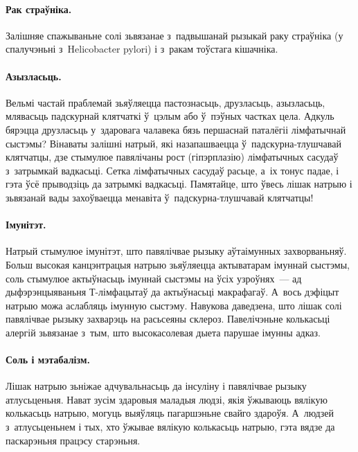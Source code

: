 \paragraph{Рак страўніка.}
Залішняе спажываньне солі зьвязанае з~падвышанай рызыкай раку страўніка (у спалучэньні з~Helicobacter pylori) і з~ракам тоўстага кішачніка.

\paragraph{Азызласьць.}
Вельмі частай праблемай зьяўляецца пастознасьць, друзласьць, азызласьць, млявасьць падскурнай клятчаткі ў~цэлым або ў~пэўных частках цела. Адкуль бярэцца друзласьць у~здаровага чалавека бязь першаснай паталёгіі лімфатычнай сыстэмы? Вінаваты залішні натрый, які назапашваецца ў~падскурна-тлушчавай клятчатцы, дзе стымулюе павялічаны рост (гіпэрплазію) лімфатычных сасудаў з~затрымкай вадкасьці. Сетка лімфатычных сасудаў расьце, а~іх тонус падае, і гэта ўсё прыводзіць да затрымкі вадкасьці. Памятайце, што ўвесь лішак натрыю і зьвязанай вады захоўваецца менавіта ў~падскурна-тлушчавай клятчатцы!


\paragraph{Імунітэт.}
Натрый стымулюе імунітэт, што павялічвае рызыку аўтаімунных захворваньняў. Больш высокая канцэнтрацыя натрыю зьяўляецца актыватарам імуннай сыстэмы, соль стымулюе актыўнасьць імуннай сыстэмы на ўсіх узроўнях~--- ад дыфэрэнцыяваньня Т-лімфацытаў да актыўнасьці макрафагаў. А~вось дэфіцыт натрыю можа аслабляць імунную сыстэму. Навукова даведзена, што лішак солі павялічвае рызыку захварэць на расьсеяны склероз. Павелічэньне колькасьці алергій зьвязанае з~тым, што высокасолевая дыета парушае імунны адказ.

\paragraph{Соль і мэтабалізм.}
Лішак натрыю зьніжае адчувальнасьць да інсуліну і павялічвае рызыку атлусьценьня. Нават зусім здаровыя маладыя людзі, якія ўжываюць вялікую колькасьць натрыю, могуць выяўляць пагаршэньне свайго здароўя. А~людзей з~атлусьценьнем і тых, хто ўжывае вялікую колькасьць натрыю, гэта вядзе да паскарэньня працэсу старэньня.

